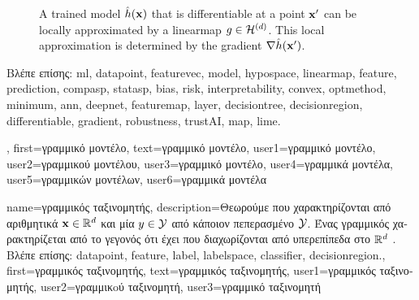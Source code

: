 {{\begin{figure}[H]
\begin{center}
\begin{tikzpicture}[x=0.5cm]
		\end{tikzpicture}
		\vspace*{-5mm}
		\end{center}
		\caption{A trained \gls{model} $\learnthypothesis(\featurevec)$ that is \gls{differentiable} at a point $\featurevec'$ 
		can be locally approximated by a \gls{linearmap} $g \in \linmodel{\nrfeatures}$. This local approximation 
		is determined by the \gls{gradient} $\nabla \learnthypothesis(\featurevec')$.}
		\label{fig_linapprox_dict}
		\end{figure}
		\foreignlanguage{greek}{Βλέπε επίσης:} \gls{ml}, \gls{datapoint}, \gls{featurevec}, \gls{model}, \gls{hypospace}, \gls{linearmap}, \gls{feature}, 
		\gls{prediction}, \gls{compasp}, \gls{statasp}, \gls{bias}, \gls{risk}, \gls{interpretability}, \gls{convex}, \gls{optmethod}, \gls{minimum}, \gls{ann}, 
		\gls{deepnet}, \gls{featuremap}, \gls{layer}, \gls{decisiontree}, \gls{decisionregion}, \gls{differentiable}, \gls{gradient}, \gls{robustness}, \gls{trustAI}, 
		\gls{map}, \gls{lime}.}, 
	first={\foreignlanguage{greek}{γραμμικό μοντέλο}},
   	text={\foreignlanguage{greek}{γραμμικό μοντέλο}},
   	user1={\foreignlanguage{greek}{γραμμικό μοντέλο}}, %
   	user2={\foreignlanguage{greek}{γραμμικού μοντέλου}}, %
   	user3={\foreignlanguage{greek}{γραμμικό μοντέλο}}, %
   	user4={\foreignlanguage{greek}{γραμμικά μοντέλα}}, %
   	user5={\foreignlanguage{greek}{γραμμικών μοντέλων}}, %
   	user6={\foreignlanguage{greek}{γραμμικά μοντέλα}} %
}

{name={\foreignlanguage{greek}{γραμμικός ταξινομητής}}, 
	description={\foreignlanguage{greek}{Θεωρούμε} 
		 \foreignlanguage{greek}{που χαρακτηρίζονται από αριθμητικά}  $\featurevec \in \mathbb{R}^{\nrfeatures}$ 
	    	\foreignlanguage{greek}{και μία}  $\truelabel \in \labelspace$ \foreignlanguage{greek}{από κάποιον
		πεπερασμένο}  $\labelspace$. 
		\foreignlanguage{greek}{Ένας γραμμικός}  \foreignlanguage{greek}{χαρακτηρίζεται από 
		το γεγονός ότι έχει}  \foreignlanguage{greek}{που διαχωρίζονται από υπερεπίπεδα 
		στο} $\mathbb{R}^{\featuredim}$ \cite[\foreignlanguage{greek}{Κεφ.} 2]{MLBasics}.\\
		\foreignlanguage{greek}{Βλέπε επίσης:} \gls{datapoint}, \gls{feature}, \gls{label}, \gls{labelspace}, \gls{classifier}, \gls{decisionregion}.},
	first={\foreignlanguage{greek}{γραμμικός ταξινομητής}},
	text={\foreignlanguage{greek}{γραμμικός ταξινομητής}},
	user1={\foreignlanguage{greek}{γραμμικός ταξινομητής}}, %
	user2={\foreignlanguage{greek}{γραμμικoύ ταξινομητή}}, %
	user3={\foreignlanguage{greek}{γραμμικό ταξινομητή}} %
}


